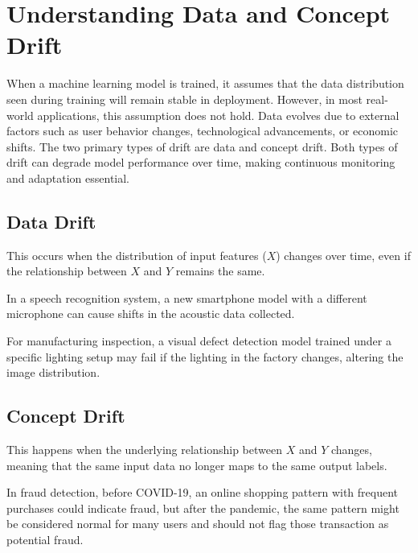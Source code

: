 \documentclass[12pt,openany]{book}
\begin{document}
\section{Understanding Data and Concept Drift}

When a machine learning model is trained, it assumes that the data distribution seen during training will remain stable in deployment. However, in most real-world applications, this assumption does not hold. Data evolves due to external factors such as user behavior changes, technological advancements, or economic shifts. The two primary types of drift are data and concept drift. Both types of drift can degrade model performance over time, making continuous monitoring and adaptation essential.

\subsection{Data Drift}

This occurs when the distribution of input features (\(X\)) changes over time, even if the relationship between \(X\) and \(Y\) remains the same. 

\begin{examplebox}
    In a speech recognition system, a new smartphone model with a different microphone can cause shifts in the acoustic data collected.
\end{examplebox}

\begin{examplebox}
    For manufacturing inspection, a visual defect detection model trained under a specific lighting setup may fail if the lighting in the factory changes, altering the image distribution.
\end{examplebox}

\subsection{Concept Drift}

This happens when the underlying relationship between \(X\) and \(Y\) changes, meaning that the same input data no longer maps to the same output labels.
    
\begin{examplebox}
     In fraud detection, before COVID-19, an online shopping pattern with frequent purchases could indicate fraud, but after the pandemic, the same pattern might be considered normal for many users and should not flag those transaction as potential fraud.
\end{examplebox}
\end{document}
